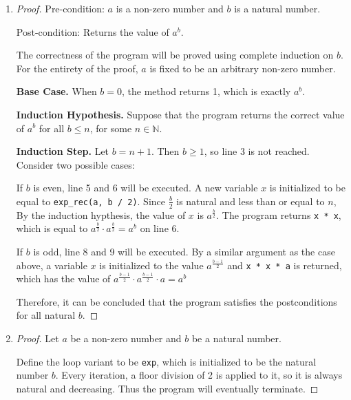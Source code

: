 \documentclass[11pt]{article}
\begin{document}
    \begin{enumerate}[label=(\alph*)]
        \item 
        \begin{proof}
            Pre-condition: \(a\) is a non-zero number and \(b\) is a natural number.
            
            Post-condition: Returns the value of \(a^b\).

            The correctness of the program will be proved using complete induction on \(b\). For the entirety of the proof, \(a\) is fixed to be an arbitrary non-zero number.

            \textbf{Base Case.} When \(b=0\), the method returns 1, which is exactly \(a^b\).

            \textbf{Induction Hypothesis.} Suppose that the program returns the correct value of \(a^b\) for all \(b \leq n\), for some \(n \in \mathbb{N}\).

            \textbf{Induction Step.} Let \(b = n+1\). Then \(b \geq 1\), so line 3 is not reached. Consider two possible cases:
            
            If \(b\) is even, line 5 and 6 will be executed. A new variable \(x\) is initialized to be equal to \verb|exp_rec(a, b / 2)|. Since \(\frac{b}{2}\) is natural and less than or equal to \(n\), By the induction hypthesis, the value of \(x\) is \(a^{\frac{b}{2}}\). The program returns \verb|x * x|, which is equal to \(a^{\frac{b}{2}} \cdot a^{\frac{b}{2}} = a^b\) on line 6. 

            If \(b\) is odd, line 8 and 9 will be executed. By a similar argument as the case above, a variable \(x\) is initialized to the value \(a^{\frac{b-1}{2}}\) and \verb|x * x * a| is returned, which has the value of \(a^{\frac{b-1}{2}} \cdot a^{\frac{b-1}{2}} \cdot a = a^b\)

            Therefore, it can be concluded that the program satisfies the postconditions for all natural \(b\).

        \end{proof}

        \item 
        \begin{proof}
            Let \(a\) be a non-zero number and \(b\) be a natural number. 
            
            Define the loop variant to be \verb|exp|, which is initialized to be the natural number \(b\). Every iteration, a floor division of 2 is applied to it, so it is always natural and decreasing. Thus the program will eventually terminate.
            

\end{proof}
\end{enumerate}
\end{document}

